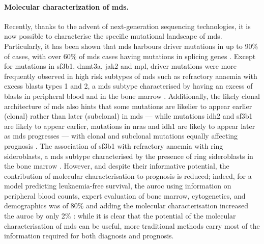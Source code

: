 \paragraph{Molecular characterization of \ac{mds}.} Recently, thanks to the advent of next-generation sequencing technologies, it is now possible to characterise the specific mutational landscape of \ac{mds}. Particularly, it has been shown that \ac{mds} harbours driver mutations in up to 90\% of cases, with over 60\% of \ac{mds} cases having mutations in splicing genes \cite{Papaemmanuil2013-yt,Haferlach2014-bh}. Except for mutations in \ac{sf3b1}, \ac{dnmt3a}, \ac{jak2} and \ac{mpl}, driver mutations were more frequently observed in high risk subtypes of \ac{mds} such as refractory anaemia with excess blasts types 1 and 2, a \ac{mds} subtype characterised by having an excess of blasts in peripheral blood and in the bone marrow \cite{Haferlach2014-bh}. Additionally, the likely clonal architecture of \ac{mds} also hints that some mutations are likelier to appear earlier (clonal) rather than later (subclonal) in \ac{mds} --- while mutations \ac{idh2} and \ac{sf3b1} are likely to appear earlier, mutations in \ac{nras} and \ac{idh1} are likely to appear later as \ac{mds} progresses --- with clonal and subclonal mutations equally affecting prognosis \cite{Papaemmanuil2013-yt}. The association of \ac{sf3b1} with refractory anaemia with ring sideroblasts, a \ac{mds} subtype characterised by the presence of ring sideroblasts in the bone marrow \cite{Papaemmanuil2011-nr, Papaemmanuil2013-yt, Haferlach2014-bh}. However, and despite their informative potential, the contribution of molecular characterisation to prognosis is reduced; indeed, for a model predicting leukaemia-free survival, the \ac{auroc} using information on peripheral blood counts, expert evaluation of bone marrow, cytogenetics, and demographics was of 80\% and adding the molecular characterisation increased the \ac{auroc} by only 2\% \cite{Papaemmanuil2013-yt}: while it is clear that the potential of the molecular characterisation of \ac{mds} can be useful, more traditional methods carry most of the information required for both diagnosis and prognosis.

